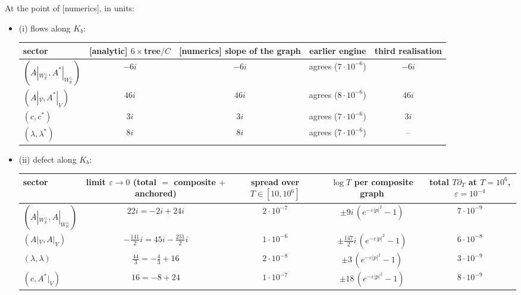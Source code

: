 \begin{proposition}
\label{prop:kj-compare}
At the point of [numerics], in units:
\begin{itemize}
\item (i) flows along $K_b$:
\begin{tabular}{l|c|c|c|c}
sector & [analytic] $6\times$tree$/C$ & [numerics] slope of the graph & earlier engine & third realisation \\
\hline
$(A|_{W_{\mathbb R}^\perp},A^*|_{W_{\mathbb R}^\perp})$ & $-6i$ & $-6i$ & agrees ($7\cdot10^{-6}$) & $-6i$ \\
$(A|_V,A^*|_V)$ & $46i$ & $46i$ & agrees ($8\cdot10^{-6}$) & $46i$ \\
$(c,c^*)$ & $3i$ & $3i$ & agrees ($7\cdot10^{-6}$) & $3i$ \\
$(\lambda,\lambda^*)$ & $8i$ & $8i$ & agrees ($7\cdot10^{-6}$) & -- \\
\end{tabular}
\item (ii) defect along $K_b$:
\begin{tabular}{l|c|c|c|c}
sector & limit $\varepsilon\to0$ (total $=$ composite $+$ anchored) & spread over $T\in[10,10^6]$ & $\log T$ per composite graph & total $T\partial_T$ at $T=10^6$, $\varepsilon=10^{-4}$ \\
\hline
$(A|_{W_{\mathbb R}^\perp},A|_{W_{\mathbb R}^\perp})$ & $22i=-2i+24i$ & $2\cdot10^{-7}$ & $\pm9i\,(e^{-\varepsilon|p|^2}-1)$ & $7\cdot10^{-9}$ \\
$(A|_V,A|_V)$ & $-\tfrac{141}2i=45i-\tfrac{231}2i$ & $1\cdot10^{-6}$ & $\pm\tfrac{147}2i\,(e^{-\varepsilon|p|^2}-1)$ & $6\cdot10^{-8}$ \\
$(\lambda,\lambda)$ & $\tfrac{44}3=-\tfrac43+16$ & $2\cdot10^{-8}$ & $\pm3\,(e^{-\varepsilon|p|^2}-1)$ & $3\cdot10^{-9}$ \\
$(c,A^*|_V)$ & $16=-8+24$ & $1\cdot10^{-7}$ & $\pm18\,(e^{-\varepsilon|p|^2}-1)$ & $8\cdot10^{-9}$ \\
\end{tabular}

\end{itemize}
\end{proposition}
